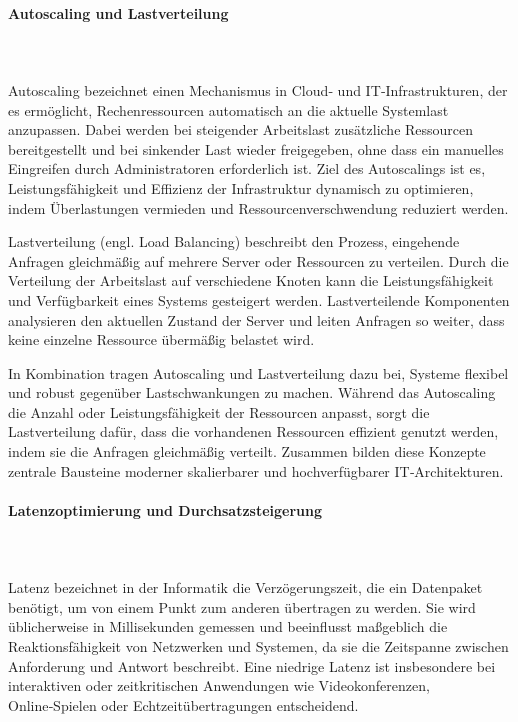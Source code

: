 \paragraph{Autoscaling und Lastverteilung}
\mbox{}\\
\mbox{}\\
Autoscaling bezeichnet einen Mechanismus in Cloud‑ und IT‑Infrastrukturen, der es ermöglicht, Rechenressourcen automatisch an die aktuelle Systemlast anzupassen. Dabei werden bei steigender Arbeitslast zusätzliche Ressourcen bereitgestellt und bei sinkender Last wieder freigegeben, ohne dass ein manuelles Eingreifen durch Administratoren erforderlich ist. Ziel des Autoscalings ist es, Leistungsfähigkeit und Effizienz der Infrastruktur dynamisch zu optimieren, indem Überlastungen vermieden und Ressourcenverschwendung reduziert werden.\cite{teamtakt_devops_lastverteilung}

Lastverteilung (engl. Load Balancing) beschreibt den Prozess, eingehende Anfragen gleichmäßig auf mehrere Server oder Ressourcen zu verteilen. Durch die Verteilung der Arbeitslast auf verschiedene Knoten kann die Leistungsfähigkeit und Verfügbarkeit eines Systems gesteigert werden. Lastverteilende Komponenten analysieren den aktuellen Zustand der Server und leiten Anfragen so weiter, dass keine einzelne Ressource übermäßig belastet wird.\cite{teamtakt_devops_lastverteilung}

In Kombination tragen Autoscaling und Lastverteilung dazu bei, Systeme flexibel und robust gegenüber Lastschwankungen zu machen. Während das Autoscaling die Anzahl oder Leistungsfähigkeit der Ressourcen anpasst, sorgt die Lastverteilung dafür, dass die vorhandenen Ressourcen effizient genutzt werden, indem sie die Anfragen gleichmäßig verteilt. Zusammen bilden diese Konzepte zentrale Bausteine moderner skalierbarer und hochverfügbarer IT‑Architekturen.\cite{teamtakt_devops_lastverteilung}

\paragraph{Latenzoptimierung und Durchsatzsteigerung}
\mbox{}\\
\mbox{}\\
Latenz bezeichnet in der Informatik die Verzögerungszeit, die ein Datenpaket benötigt, um von einem Punkt zum anderen übertragen zu werden. Sie wird üblicherweise in Millisekunden gemessen und beeinflusst maßgeblich die Reaktionsfähigkeit von Netzwerken und Systemen, da sie die Zeitspanne zwischen Anforderung und Antwort beschreibt. Eine niedrige Latenz ist insbesondere bei interaktiven oder zeitkritischen Anwendungen wie Videokonferenzen, Online‑Spielen oder Echtzeitübertragungen entscheidend.\cite{studysmarter_latenz_durchsatz}

